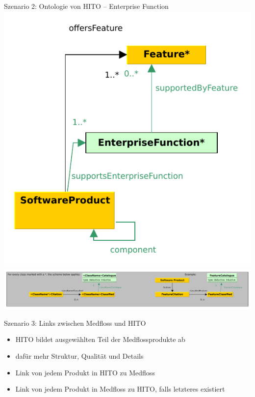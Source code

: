 \documentclass[aspectratio=1610,12pt]{beamer}
\begin{document}
\begin{frame}{Szenario 2: Ontologie von HITO -- Enterprise Function}
\centering
\vspace{-.5cm}
\includegraphics[height=0.55\textheight]{img/excerpt3.pdf}
\includegraphics[width=\textwidth]{img/excerpt1.pdf}
\end{frame}


\begin{frame}{Szenario 3: Links zwischen Medfloss und HITO}
\begin{spacing}{1.5}
\begin{itemize}
\item HITO bildet ausgewählten Teil der Medflossprodukte ab
\item dafür mehr Struktur, Qualität und Details
\item Link von jedem Produkt in HITO zu Medfloss
\item Link von jedem Produkt in Medfloss zu HITO, falls letzteres existiert
\end{itemize}
\end{spacing}
\end{frame}
\end{document}
